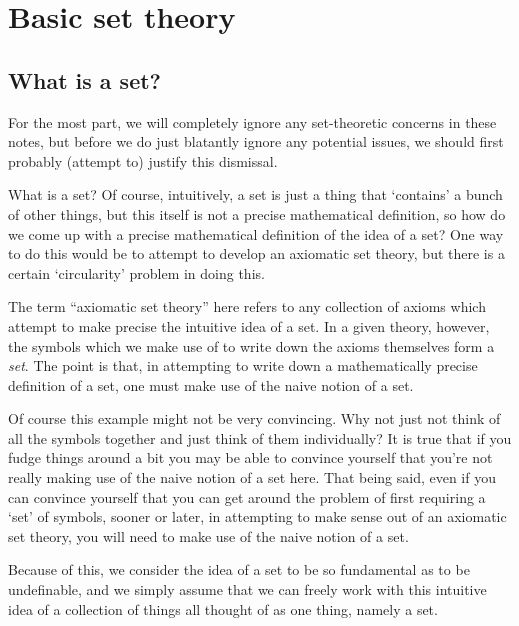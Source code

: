 \section{Basic set theory}

\subsection{What is a set?}\label{sbsA.1.1}

For the most part, we will completely ignore any set-theoretic concerns in these notes, but before we do just blatantly ignore any potential issues, we should first probably (attempt to) justify this dismissal.

What is a set?  Of course, intuitively, a set is just a thing that `contains' a bunch of other things, but this itself is not a precise mathematical definition, so how do we come up with a precise mathematical definition of the idea of a set?  One way to do this would be to attempt to develop an axiomatic set theory, but there is a certain `circularity' problem in doing this.

The term ``axiomatic set theory'' here refers to any collection of axioms which attempt to make precise the intuitive idea of a set.  In a given theory, however, the symbols which we make use of to write down the axioms themselves form a \emph{set}.  The point is that, in attempting to write down a mathematically precise definition of a set, one must make use of the naive notion of a set.

Of course this example might not be very convincing.  Why not just not think of all the symbols together and just think of them individually?  It is true that if you fudge things around a bit you may be able to convince yourself that you're not really making use of the naive notion of a set here.  That being said, even if you can convince yourself that you can get around the problem of first requiring a `set' of symbols, sooner or later, in attempting to make sense out of an axiomatic set theory, you will need to make use of the naive notion of a set.

Because of this, we consider the idea of a set to be so fundamental as to be undefinable, and we simply assume that we can freely work with this intuitive idea of a collection of things all thought of as one thing, namely a set.

